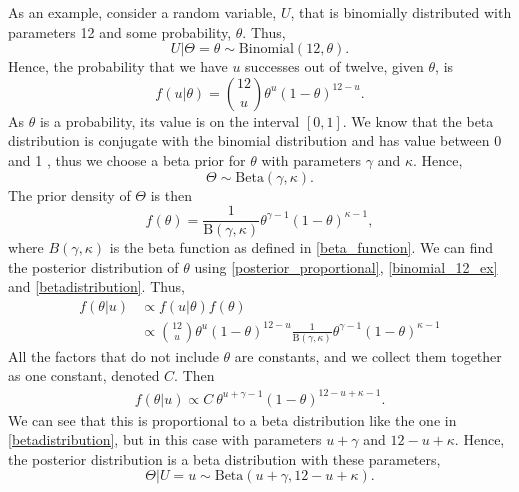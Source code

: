As an example, consider a random variable, $U$, that is binomially distributed with parameters 12 and some probability, $\theta$. Thus,
\begin{equation*}
    U|\Theta=\theta \sim \mathrm{Binomial}(12,\theta).
\end{equation*}
Hence, the probability that we have $u$ successes out of twelve, given $\theta$, is
\begin{equation}
\label{binomial_12_ex}
    f(u|\theta) = \binom{12}{u} \theta^{u} (1-\theta)^{12-u}.
\end{equation}
As $\theta$ is a probability, its value is on the interval $[0,1]$. We know that the beta distribution is conjugate with the binomial distribution and has value between 0 and 1 \citep{statinf}, thus we choose a beta prior for $\theta$ with parameters $\gamma$ and $\kappa$. Hence,
\begin{equation}
\label{theta_with_beta_prior}
    \Theta \sim \mathrm{Beta}(\gamma,\kappa). 
\end{equation}
The prior density of $\Theta$ is then
\begin{equation}
    \label{betadistribution}
    f(\theta) = \frac{1}{\mathrm{B}(\gamma,\kappa)}\theta^{\gamma-1}(1-\theta)^{\kappa-1},
\end{equation}
where $B(\gamma,\kappa)$ is the beta function as defined in \eqref{beta_function}.
We can find the posterior distribution of $\theta$ using \eqref{posterior_proportional}, \eqref{binomial_12_ex} and \eqref{betadistribution}. Thus,
\begin{equation*}
    \begin{aligned}
        f(\theta|u) 
        &\propto f(u|\theta)f(\theta)\\[6pt]
        &\propto \binom{12}{u} \theta^{u} (1-\theta)^{12-u} \frac{1}{\mathrm{B}(\gamma,\kappa)}\theta^{\gamma-1}(1-\theta)^{\kappa-1}
    \end{aligned}
\end{equation*}
All the factors that do not include $\theta$ are constants, and we collect them together as one constant, denoted $C$. Then
\begin{equation*}
    \begin{aligned}
        f(\theta|u) 
        \propto C \: \theta^{u+\gamma-1}(1-\theta)^{12-u+\kappa-1}.
    \end{aligned}
\end{equation*}
We can see that this is proportional to a beta distribution like the one in \eqref{betadistribution}, but in this case with parameters $u+\gamma$ and $12-u+\kappa$. Hence, the posterior distribution is a beta distribution with these parameters, 
\begin{equation*}
    \Theta|U=u \sim \mathrm{Beta}(u+\gamma,12-u+\kappa).
\end{equation*}






